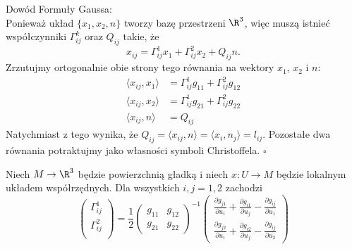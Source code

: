\begin{frame}
\textcolor{ared}{Dowód Formuły Gaussa:}\\\pause
Ponieważ układ $\{x_1, x_2, n\}$ tworzy bazę przestrzeni $\R^3$, więc muszą istnieć współczynniki $\Gamma^k_{ij}$ oraz $Q_{ij}$ takie, że \[x_{ij}=\Gamma^1_{ij}x_1+\Gamma^2_{ij}x_2+Q_{ij}n.\]\pause
Zrzutujmy ortogonalnie obie strony tego równania na wektory $x_1$, $x_2$ i $n$:
\begin{align*}
\langle x_{ij},x_1 \rangle&=\Gamma^1_{ij}g_{11}+\Gamma^2_{ij}g_{12}\\
\langle x_{ij}, x_2\rangle&=\Gamma^1_{ij}g_{21}+\Gamma^2_{ij}g_{22}\\
\langle x_{ij}, n\rangle&=Q_{ij}
\end{align*}
\pause Natychmiast z tego wynika, że $Q_{ij}=\langle x_{ij}, n\rangle=\langle x_i , n_j \rangle = l_{ij}$. Pozostałe dwa równania potraktujmy jako własności symboli Christoffela.
\hfill $\square$
\end{frame}
\begin{frame}[<+->]
\begin{lemat}\label{lem:christoffel-prop}
Niech $M\to \R^3$ będzie powierzchnią gładką i niech $x\colon U\to M$ będzie lokalnym układem współrzędnych. Dla wszystkich $i, j=1,2$ zachodzi
\[
\left(
\begin{array}{c}
\Gamma^1_{ij}\\
\Gamma^2_{ij}\\
\end{array}
\right)
=\frac{1}{2}\left(
\begin{array}{cc}
g_{11} & g_{12}\\
g_{21} & g_{22}
\end{array}
\right)^{-1}
\left(
\begin{array}{c}
\frac{\partial g_{j1}}{\partial u_i}+\frac{\partial g_{i1}}{\partial u_j}-\frac{\partial g_{ij}}{\partial u_1}\\
\frac{\partial g_{j2}}{\partial u_i}+\frac{\partial g_{i2}}{\partial u_j}-\frac{\partial g_{ij}}{\partial u_2}
\end{array}
\right)
\]
\end{lemat}
\end{frame}

